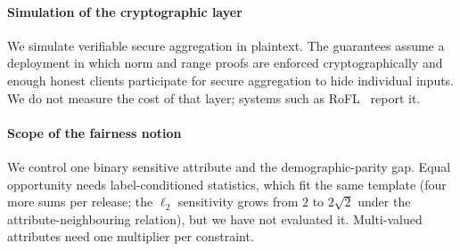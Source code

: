 \paragraph{Simulation of the cryptographic layer}
We simulate verifiable secure aggregation in plaintext. The guarantees assume a deployment in which norm and range proofs are enforced cryptographically and enough honest clients participate for secure aggregation to hide individual inputs. We do not measure the cost of that layer; systems such as RoFL~\citep{lycklama2023rofl} report it.

\paragraph{Scope of the fairness notion}
We control one binary sensitive attribute and the demographic-parity gap. Equal opportunity needs label-conditioned statistics, which fit the same template (four more sums per release; the $\ell_2$ sensitivity grows from $2$ to $2\sqrt{2}$ under the attribute-neighbouring relation), but we have not evaluated it. Multi-valued attributes need one multiplier per constraint.
